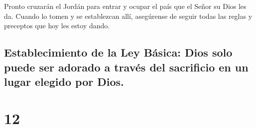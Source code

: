  Pronto cruzarán el Jordán para entrar y ocupar el país
que el Señor su Dios les da. Cuando lo tomen y se establezcan allí,
 asegúrense de seguir todas las reglas y preceptos que
hoy les estoy dando.

\hypertarget{establecimiento-de-la-ley-buxe1sica-dios-solo-puede-ser-adorado-a-travuxe9s-del-sacrificio-en-un-lugar-elegido-por-dios.}{%
\subsection{Establecimiento de la Ley Básica: Dios solo puede ser
adorado a través del sacrificio en un lugar elegido por
Dios.}\label{establecimiento-de-la-ley-buxe1sica-dios-solo-puede-ser-adorado-a-travuxe9s-del-sacrificio-en-un-lugar-elegido-por-dios.}}

\hypertarget{section-11}{%
\section{12}\label{section-11}}


